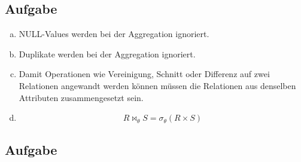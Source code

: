 \documentclass[11pt,a4paper,DIV=9]{scrartcl}
\newcounter{temp}
\newcommand{\aufgabe}[1]{
  \setcounter{temp}{\value{subsection}}
  \setcounter{subsection}{#1}
  \addtocounter{subsection}{-1}
  \subsection{Aufgabe}
  \setcounter{subsection}{\value{temp}}
}
\begin{document}
\aufgabe{2}
 \begin{enumerate}[a)]
   \item NULL-Values werden bei der Aggregation ignoriert.
   \item Duplikate werden bei der Aggregation ignoriert.
   \item Damit Operationen wie Vereinigung, Schnitt oder Differenz auf zwei Relationen angewandt werden k\"onnen m\"ussen die Relationen aus denselben Attributen zusammengesetzt sein.
   \item \begin{displaymath} R \Join _{\theta} S =  \sigma _{\theta} (R \times S) \end{displaymath}
 \end{enumerate}
\aufgabe{3}
\end{document}
